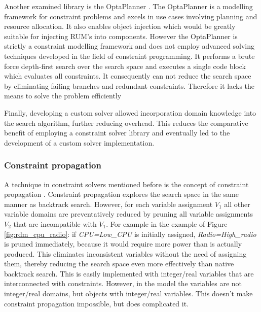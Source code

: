 Another examined library is the OptaPlanner \cite{web:opta}. The OptaPlanner is a modelling framework for constraint problems and excels in use cases involving planning and resource allocation. It also enables object injection which would be greatly suitable for injecting RUM's into components. However the OptaPlanner is strictly a constraint modelling framework and does not employ advanced solving techniques developed in the field of constraint programming. It performs a brute force depth-first search over the search space and executes a single code block which evaluates all constraints. It consequently can not reduce the search space by eliminating failing branches and redundant constraints. Therefore it lacks the means to solve the problem efficiently

Finally, developing a custom solver allowed incorporation domain knowledge into the search algorithm, further reducing overhead. This reduces the comparative benefit of employing a constraint solver library and eventually led to the development of a custom solver implementation.

\subsubsection{Constraint propagation}
A technique in constraint solvers mentioned before is the concept of constraint propagation \cite{constraint_general}. Constraint propagation explores the search space in the same manner as backtrack search. However, for each variable assignment $V_1$ all other variable domains are preventatively reduced by pruning all variable assignments $V_2$ that are incompatible with $V_1$. For example in the example of Figure \ref{fig:rdm_cpu_radio}: if \emph{CPU=Low\_CPU} is initially assigned, \emph{Radio=High\_radio} is pruned immediately, because it would require more power than is actually produced. This eliminates inconsistent variables without the need of assigning them, thereby reducing the search space even more effectively than native backtrack search. This is easily implemented with integer/real variables that are interconnected with constraints. However, in the model the variables are not integer/real domains, but objects with integer/real variables. This doesn't make constraint propagation impossible, but does complicated it.

